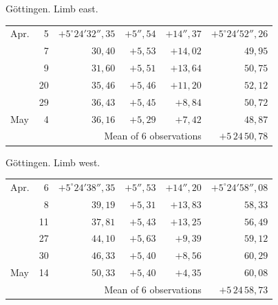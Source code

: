 \noindent\begin{minipage}[t]{.495\textwidth}\centering Göttingen. Limb east.\par\smallskip
{\scriptsize\setlength{\tabcolsep}{1pt}\renewcommand{\arraystretch}{1.2}\begin{tabular}{lr|r|r|r|r|}
Apr.&5&$+5^\circ24'32''{,}35$&$+5''{,}54$&$+14''{,}37$&$+5^\circ24'52''{,}26$\\
&7&$30{,}40$&$+5{,}53$&$+14{,}02$&$49{,}95$\\
&9&$31{,}60$&$+5{,}51$&$+13{,}64$&$50{,}75$\\
&20&$35{,}46$&$+5{,}46$&$+11{,}20$&$52{,}12$\\
&29&$36{,}43$&$+5{,}45$&$+8{,}84$&$50{,}72$\\
May&4&$36{,}16$&$+5{,}29$&$+7{,}42$&$48{,}87$\\
\cline{6-6}\multicolumn{5}{r}{Mean of 6 observations}&$+5\,24\,50{,}78$
\end{tabular}}\end{minipage}\hfill\begin{minipage}[t]{.495\textwidth}\centering Göttingen. Limb west.\par\smallskip
{\scriptsize\setlength{\tabcolsep}{1pt}\renewcommand{\arraystretch}{1.2}\begin{tabular}{lr|r|r|r|r}
Apr.&6&$+5^\circ24'38''{,}35$&$+5''{,}53$&$+14''{,}20$&$+5^\circ24'58''{,}08$\\
&8&$39{,}19$&$+5{,}31$&$+13{,}83$&$58{,}33$\\
&11&$37{,}81$&$+5{,}43$&$+13{,}25$&$56{,}49$\\
&27&$44{,}10$&$+5{,}63$&$+9{,}39$&$59{,}12$\\
&30&$46{,}33$&$+5{,}40$&$+8{,}56$&$60{,}29$\\
May&14&$50{,}33$&$+5{,}40$&$+4{,}35$&$60{,}08$\\
\cline{6-6}\multicolumn{5}{r}{Mean of 6 observations}&$+5\,24\,58{,}73$
\end{tabular}}\end{minipage}
\par\vspace{4mm}

